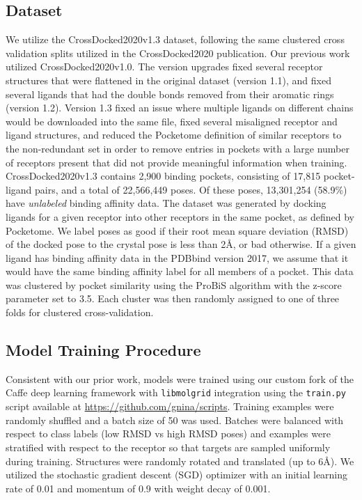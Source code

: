 \documentclass[journal=jmcmar,manuscript=article]{achemso}
\begin{document}
\subsection{Dataset}
We utilize the CrossDocked2020v1.3 dataset, following the same clustered cross validation splits utilized in the CrossDocked2020 publication.\cite{crossdocked2020}
Our previous work utilized CrossDocked2020v1.0\cite{crossdocked2020}.
The version upgrades fixed several receptor structures that were flattened in the original dataset (version 1.1), and fixed several ligands that had the double bonds removed from their aromatic rings (version 1.2).
Version 1.3 fixed an issue where multiple ligands on different chains would be downloaded into the same file, fixed several misaligned receptor and ligand structures, and reduced the Pocketome definition of similar receptors to the non-redundant set in order to remove entries in pockets with a large number of receptors present that did not provide meaningful information when training.
CrossDocked2020v1.3 contains 2,900 binding pockets, consisting of 17,815 pocket-ligand pairs, and a total of 22,566,449 poses.
Of these poses, 13,301,254 (58.9\%) have \emph{unlabeled} binding affinity data.
The dataset was generated by docking ligands for a given receptor into other receptors in the same pocket, as defined by Pocketome\cite{pocketome}.
We label poses as good if their root mean square deviation (RMSD) of the docked pose to the crystal pose is less than 2{\AA}, or bad otherwise.
If a given ligand has binding affinity data in the PDBbind version 2017, we assume that it would have the same binding affinity label for all members of a pocket.
This data was clustered by pocket similarity using the ProBiS \cite{ProBiS} algorithm with the z-score parameter set to 3.5.
Each cluster was then randomly assigned to one of three folds for clustered cross-validation.


\subsection{Model Training Procedure}
Consistent with our prior work\cite{crossdocked2020}, models were trained using our custom fork of the Caffe deep learning framework \cite{jia2014caffe} with \texttt{libmolgrid} integration \cite{sunseri2019libmolgrid} using the \texttt{train.py} script available at \url{https://github.com/gnina/scripts}.
Training examples were randomly shuffled and a batch size of 50 was used.
Batches were balanced with respect to class labels (low RMSD vs high RMSD poses) and examples were stratified with respect to the receptor so that targets are sampled uniformly during training.
Structures were randomly rotated and translated (up to 6{\AA}).
We utilized the stochastic gradient descent (SGD) optimizer with an initial learning rate of 0.01 and momentum of 0.9 with weight decay of 0.001.
\end{document}
